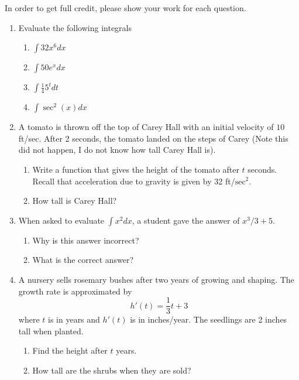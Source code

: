 \documentclass[12pt]{article}
\begin{document}
In order to get full credit, please show your work for each question.
\begin{enumerate}
\item Evaluate the following integrals
\begin{enumerate}
\item $\int 32 x^{6}dx$
\vspace{4cm}
\item $\int 50e^{x}dx$
\vspace{4cm}
\item $\int \frac{1}{4}5^tdt$
\vspace{4cm}
\item $\int \sec^2(x)dx$
\vspace{4cm}
\end{enumerate}
\newpage
\item A tomato is thrown off the top of Carey Hall with an initial velocity of $10$ ft/sec. After 2 seconds, the tomato landed on the steps of Carey (Note this did not happen, I do not know how tall Carey Hall is). 
\begin{enumerate}
\item Write a function that gives the height of the tomato after $t$ seconds. Recall that acceleration due to gravity is given by 32 ft/$\text{sec}^2$. 
\vspace{4cm}
\item How tall is Carey Hall?
\vspace{2cm}
\end{enumerate}
\item When asked to evaluate $\int x^2dx$, a student gave the answer of $x^3/3+5$. 
\begin{enumerate}
\item Why is this answer incorrect?
\vspace{3cm}
\item What is the correct answer?
\end{enumerate}
\newpage
\item A nursery sells rosemary bushes after two years of growing and shaping. The growth rate is approximated by 
\[h'(t)=\frac{1}{3}t+3\] where $t$ is in years and $h'(t)$ is in inches/year. The seedlings are 2 inches tall when planted.
\begin{enumerate}
\item Find the height after $t$ years. 
\vspace{3cm}
\item How tall are the shrubs when they are sold?
\vspace{3cm}

\end{enumerate}
\end{enumerate}
\end{document}
